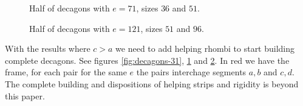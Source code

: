 \documentclass[11pt]{article}
\begin{document}
\begin{figure}[H]
\centering
{}
\caption{Half of decagons with $e=71$, sizes $36$ and $51$.}
\label{fig:decagons-71} 
\end{figure}


\begin{figure}[H]
\centering
{}
\caption{Half of decagons with $e=121$, sizes $51$ and $96$.}
\label{fig:decagons-121} 
\end{figure}

With the results where $c > a$ we need to add helping rhombi to start
building complete decagons. See figures \ref{fig:decagons-31},
\ref{fig:decagons-71} and \ref{fig:decagons-121}. In red we have the frame, for each
pair for the same $e$ the pairs interchage segments $a,b$ and $c,d$. The complete
building and dispositions of helping strips and rigidity is beyond this paper.
\end{document}
